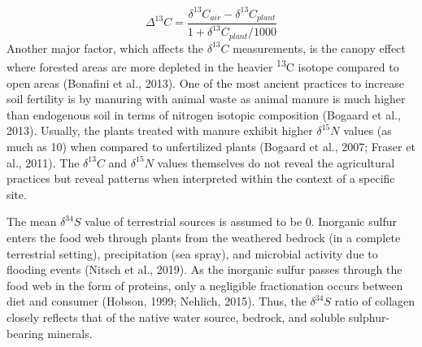 \documentclass[3p]{elsarticle} %
\begin{document}
\[\Delta^{13}C = \frac{\delta ^{13}C_{air} - \delta ^{13}C_{plant}}{1+\delta ^{13}C_{plant}/1000}\]
Another major factor, which affects the \(\delta ^{13}C\) measurements, is the canopy effect where forested areas are more depleted in the heavier \textsuperscript{13}C isotope compared to open areas (Bonafini et al., 2013). One of the most ancient practices to increase soil fertility is by manuring with animal waste as animal manure is much higher than endogenous soil in terms of nitrogen isotopic composition (Bogaard et al., 2013). Usually, the plants treated with manure exhibit higher \(\delta ^{15}N\) values (as much as 10\permil) when compared to unfertilized plants (Bogaard et al., 2007; Fraser et al., 2011). The \(\delta ^{13}C\) and \(\delta ^{15}N\) values themselves do not reveal the agricultural practices but reveal patterns when interpreted within the context of a specific site.

The mean \(\delta ^{34}S\) value of terrestrial sources is assumed to be 0\permil. Inorganic sulfur enters the food web through plants from the weathered bedrock (in a complete terrestrial setting), precipitation (sea spray), and microbial activity due to flooding events (Nitsch et al., 2019). As the inorganic sulfur passes through the food web in the form of proteins, only a negligible fractionation occurs between diet and consumer (Hobson, 1999; Nehlich, 2015). Thus, the \(\delta ^{34}S\) ratio of collagen closely reflects that of the native water source, bedrock, and soluble sulphur-bearing minerals.
\end{document}
